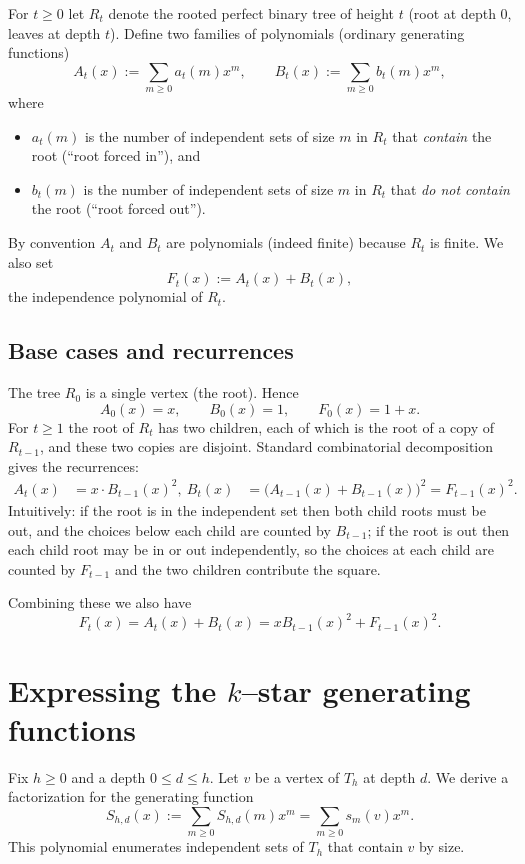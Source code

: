 \documentclass[11pt]{article}
\begin{document}
For $t\ge0$ let $R_t$ denote the rooted perfect binary tree of height $t$ (root at depth $0$, leaves at depth $t$). Define two families of polynomials (ordinary generating functions)
\[
	A_t(x):=\sum_{m\ge0} a_t(m)x^m,\qquad B_t(x):=\sum_{m\ge0} b_t(m)x^m,
\]
where
\begin{itemize}[nosep]
	\item $a_t(m)$ is the number of independent sets of size $m$ in $R_t$ that \emph{contain} the root (``root forced in''), and
	\item $b_t(m)$ is the number of independent sets of size $m$ in $R_t$ that \emph{do not contain} the root (``root forced out'').
\end{itemize}
By convention $A_t$ and $B_t$ are polynomials (indeed finite) because $R_t$ is finite. We also set
\[
	F_t(x):=A_t(x)+B_t(x),
\]
the independence polynomial of $R_t$.

\subsection{Base cases and recurrences}
The tree $R_0$ is a single vertex (the root). Hence
\[
	A_0(x)=x,\qquad B_0(x)=1,\qquad F_0(x)=1+x.
\]
For $t\ge1$ the root of $R_t$ has two children, each of which is the root of a copy of $R_{t-1}$, and these two copies are disjoint. Standard combinatorial decomposition gives the recurrences:
\begin{align}
	A_t(x) & =x\cdot B_{t-1}(x)^2,\label{eq:At}\
	B_t(x) & =\bigl(A_{t-1}(x)+B_{t-1}(x)\bigr)^2=F_{t-1}(x)^2.\label{eq:Bt}
\end{align}
Intuitively: if the root is in the independent set then both child roots must be out, and the choices below each child are counted by $B_{t-1}$; if the root is out then each child root may be in or out independently, so the choices at each child are counted by $F_{t-1}$ and the two children contribute the square.

Combining these we also have
\[
	F_t(x)=A_t(x)+B_t(x)=xB_{t-1}(x)^2+F_{t-1}(x)^2.\label{eq:Ft}
\]

\section{Expressing the $k$--star generating functions}

Fix $h\ge0$ and a depth $0\le d\le h$. Let $v$ be a vertex of $T_h$ at depth $d$. We derive a factorization for the generating function
\[
	S_{h,d}(x):=\sum_{m\ge0} S_{h,d}(m)x^m=\sum_{m\ge0}s_m(v)x^m.
\]
This polynomial enumerates independent sets of $T_h$ that contain $v$ by size.
\end{document}
